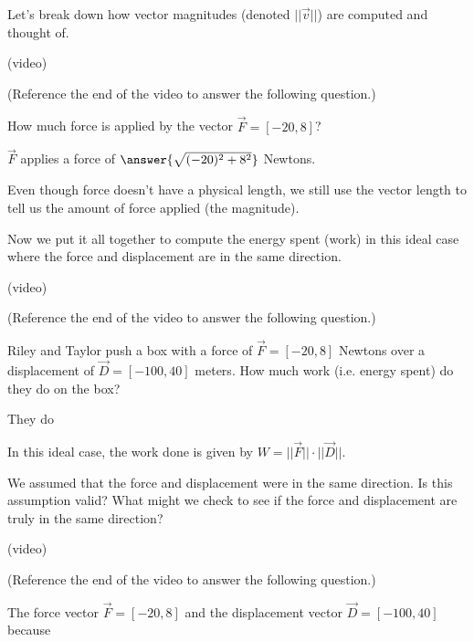 \documentclass{ximera}
\begin{document}
Let's break down how vector magnitudes (denoted $||\vec{v}||$) are computed and thought of.

(video)

\begin{problem}
    (Reference the end of the video to answer the following question.)

    How much force is applied by the vector $\vec{F}=[-20,8]$?

    $\vec{F}$ applies a force of $\answer{\sqrt{(-20)^2+8^2}}$ Newtons.

    \begin{feedback}
        Even though force doesn't have a physical length, we still use the vector length to tell us the amount of force applied (the magnitude).
    \end{feedback}
\end{problem}

Now we put it all together to compute the energy spent (work) in this ideal case where the force and displacement are in the same direction.

(video)

\begin{problem}
    (Reference the end of the video to answer the following question.)

    Riley and Taylor push a box with a force of $\vec{F}=[-20,8]$ Newtons over a displacement of $\vec{D}=[-100,40]$ meters. How much work (i.e. energy spent) do they do on the box?

    They do 

    \begin{multipleChoice}
    \end{multipleChoice}

    \begin{feedback}
        In this ideal case, the work done is given by $W=||\vec{F}||\cdot||\vec{D}||$.
    \end{feedback}

\end{problem}

We assumed that the force and displacement were in the same direction. Is this assumption valid? What might we check to see if the force and displacement are truly in the same direction?

(video)

\begin{problem}
    (Reference the end of the video to answer the following question.)

    The force vector $\vec{F}=[-20,8]$ and the displacement vector $\vec{D}=[-100,40]$  because 
\end{problem}
\end{document}
